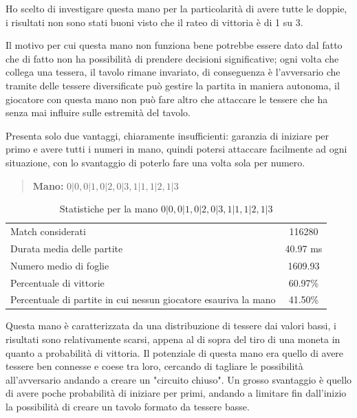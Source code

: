\documentclass[a4paper,12pt]{report} %
\begin{document}
Ho scelto di investigare questa mano per la particolarità di avere tutte le doppie, i risultati non sono stati buoni visto che il rateo di vittoria è di 1 su 3.

Il motivo per cui questa mano non funziona bene potrebbe essere dato dal fatto che di fatto non ha possibilità di prendere decisioni significative; ogni volta che collega una tessera, il tavolo rimane invariato, di conseguenza è l'avversario che tramite delle tessere diversificate può gestire la partita in maniera autonoma, il giocatore con questa mano non può fare altro che attaccare le tessere che ha senza mai influire sulle estremità del tavolo.

Presenta solo due vantaggi, chiaramente insufficienti: garanzia di iniziare per primo e avere tutti i numeri in mano, quindi potersi attaccare facilmente ad ogni situazione, con lo svantaggio di poterlo fare una volta sola per numero.

\begin{quote}
    \textbf{Mano:} \(0|0, 0|1, 0|2, 0|3, 1|1, 1|2, 1|3\)
\end{quote}

\begin{table}[h!]
    \centering
    \begin{tabular}{|l|c|}
        \hline
        Match considerati & 116280 \\
        Durata media delle partite & 40.97 ms \\
        Numero medio di foglie & 1609.93 \\
        Percentuale di vittorie & 60.97\% \\
        Percentuale di partite in cui nessun giocatore esauriva la mano & 41.50\% \\
        \hline
    \end{tabular}
    \caption{Statistiche per la mano \(0|0, 0|1, 0|2, 0|3, 1|1, 1|2, 1|3\)}
    \label{tab:stats_1}
\end{table}

Questa mano è caratterizzata da una distribuzione di tessere dai valori bassi, i risultati sono relativamente scarsi, appena al di sopra del tiro di una moneta in quanto a probabilità di vittoria.
Il potenziale di questa mano era quello di avere tessere ben connesse e coese tra loro, cercando di tagliare le possibilità all'avversario andando a creare un "circuito chiuso".
Un grosso svantaggio è quello di avere poche probabilità di iniziare per primi, andando a limitare fin dall'inizio la possibilità di creare un tavolo formato da tessere basse.
\end{document}
